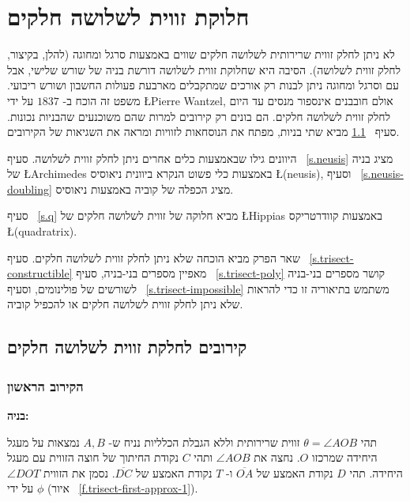 

\chapter{חלוקת זווית לשלושה חלקים}
\label{c.trisect}

לא ניתן לחלק זווית שרירותית לשלושה חלקים שווים באמצעות סרגל ומחוגה (להלן, בקיצור, לחלק זווית לשלושה). הסיבה היא שחלוקת זווית לשלושה דורשת בניה של שורש שלישי, אבל עם  וסרגל ומחוגה ניתן לבנות רק אורכים שמתקבלים מארבעת פעולות החשבון ושורש ריבועי. משפט זה הוכח ב-%
$1837$
על ידי
\L{Pierre Wantzel},
אולם חובבנים אינספור מנסים עד היום לחלק זווית לשלושה חלקים. הם בונים רק קירובים למרות שהם משוכנעים שהבניות נכונות. סעיף%
~\ref{s.trisect-approx}
מביא שתי בניות, מפתח את הנוסחאות לזוויות ומראה את השגיאות של הקירובים.

היוונים גילו שבאמצעות כלים אחרים ניתן לחלק זווית לשלושה. סעיף%
~\ref{s.neusis}
מציג בניה של
\L{Archimedes}
באמצעות כלי פשוט הנקרא ביוונית ניאוסיס
\L{(neusis)},
וסעיף%
~\ref{s.neusis-doubling}
מציג הכפלה של קוביה באמצעות ניאוסיס.

סעיף%
~\ref{s.q}
מביא חלוקה של זווית לשלושה חלקים של
\L{Hippias}
באמצעות קוודרטריקס
\L{(quadratrix)}.

שאר הפרק מביא הוכחה שלא ניתן לחלק זווית לשלושה חלקים. סעיף%
~\ref{s.trisect-constructible}
מאפיין מספרים בני-בניה, סעיף%
~\ref{s.trisect-poly}
קושר מספרים בני-בניה לשורשים של פולינומים, וסעיף%
~\ref{s.trisect-impossible}
משתמש בתיאוריה זו כדי להראות שלא ניתן לחלק זווית לשלושה חלקים או להכפיל קוביה.



\section{קירובים לחלקת זווית לשלושה חלקים}\label{s.trisect-approx}

\subsection{הקירוב הראשון}\label{sub.trisect-approx1}

\noindent\textbf{בניה:}

תהי 
$\theta=\angle AOB$
זווית שרירותית וללא הגבלת הכלליות נניח ש-%
$A,B$
נמצאות על מעגל היחידה שמרכזו 
$O$.
נחצה את 
$\angle AOB$
ותהי 
$C$
נקודת החיתוך של חוצה הזווית עם מעגל היחידה. תהי
$D$
נקודת האמצע של
$\overline{OA}$
ו-%
$T$ 
נקודת האמצע של
$\overline{DC}$.
נסמן את הזווית
$\angle DOT$
על ידי
$\phi$
(איור%
~\ref{f.trisect-first-approx-1}).

